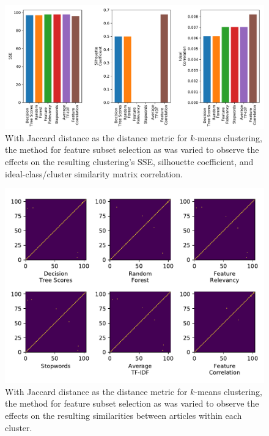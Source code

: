 \documentclass[11pt]{article}
\begin{document}
\begin{figure}[h!] \label{fig:something}
  \centering
  \includegraphics[width=\textwidth]{figures/hw3/jaccard/feature_subset_selection}
  \caption{With Jaccard distance as the distance metric for $k$-means clustering, the method for feature subset selection as was varied to observe the effects on the resulting clustering's SSE, silhouette coefficient, and ideal-class/cluster similarity matrix correlation.}
\end{figure}

\begin{figure}[h!] \label{fig:something}
  \centering
  \includegraphics[width=\textwidth]{figures/hw3/jaccard/similarity_matrices}
  \caption{With Jaccard distance as the distance metric for $k$-means clustering, the method for feature subset selection as was varied to observe the effects on the resulting similarities between articles within each cluster.}
\end{figure}


\end{document}
